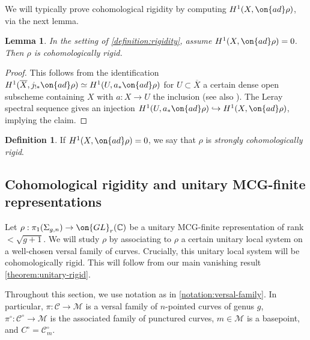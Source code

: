\documentclass[12 pt]{amsart}
\theoremstyle{plain}
\newtheorem{lemma}[subsubsection]{Lemma}
\theoremstyle{definition}
\newtheorem{definition}[subsubsection]{Definition}
\theoremstyle{remark}
\numberwithin{equation}{section}
\begin{document}
We will typically prove cohomological rigidity by computing 
$H^1(X, \on{ad}\rho)$, via the next lemma.
\begin{lemma}
	\label{lemma:vanishing-h1-implies-rigidity}
		In the setting of \autoref{definition:rigidity}, assume $H^1(X, \on{ad}\rho)
	= 0$. Then $\rho$ is
	cohomologically rigid.
\end{lemma}
\begin{proof}
	This follows from the identification 
	$H^1(\overline{X}, j_{!*}\on{ad}\rho)\simeq H^1(U, a_*\on{ad}\rho)$ for
	$U \subset \overline{X}$ a certain dense open subscheme containing $X$
	with $a: X \to U$ the inclusion \cite[Remark
	2.4]{esnault2018cohomologically} (see also \cite[Remark
	4.8]{klevdalP:g-rigid-local-systems-are-integral}).
	The Leray spectral sequence gives an injection 
	$H^1(U, a_*\on{ad}\rho) \hookrightarrow H^1(X, \on{ad}\rho)$, implying
	the claim.
\end{proof}
\begin{definition}
If $H^1(X, \on{ad}\rho)=0$, we say that $\rho$ is \emph{strongly cohomologically rigid}.	
\end{definition}
\subsection{Cohomological rigidity and unitary MCG-finite representations}
\label{subsection:rigidity}

Let $\rho: \pi_1(\Sigma_{g,n})\to \on{GL}_r(\mathbb{C})$ be a unitary MCG-finite
representation of rank $<\sqrt{g+1}$. We will study $\rho$ by associating to $\rho$ a certain unitary local system on a well-chosen versal family of curves. Crucially, this unitary local system will be cohomologically rigid.
This will follow from our main vanishing result
\autoref{theorem:unitary-rigid}.

Throughout this section, we use notation as in 
\autoref{notation:versal-family}. In particular, $\pi:\mathscr{C}\to
\mathscr{M}$ is a versal family of $n$-pointed curves of genus $g$,
$\pi^\circ: \mathscr{C}^\circ \to \mathscr{M}$ is the associated family of
punctured curves, $m \in \mathscr M$ is a basepoint, and $C^\circ = \mathscr
C_m^\circ$.
\end{document}
